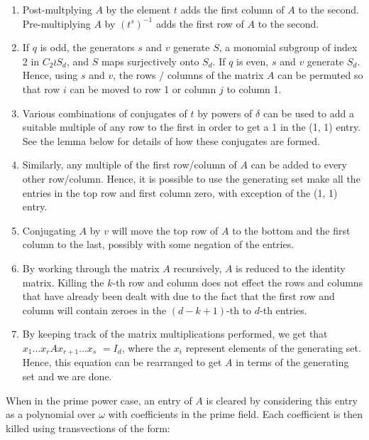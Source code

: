 \documentclass[12pt]{report}
\begin{document}
\begin{enumerate}

\item Post-multplying $A$ by the element $t$ adds the first column of $A$ to the second. Pre-multiplying $A$ by $(t^s)^{-1}$ adds the first row of $A$ to the second.

\item If $q$ is odd, the generators $s$ and $v$ generate $S$, a monomial subgroup of index 2 in $C_2 \wr S_d$, and $S$ maps surjectively onto $S_d$. If $q$ is even, $s$ and $v$ generate $S_d$. Hence, using $s$ and $v$, the rows / columns of the matrix $A$ can be permuted so that row $i$ can be moved to row 1 or column $j$ to column 1.

\item Various combinations of conjugates of $t$ by powers of $\delta$ can be used to add a suitable multiple of any row to the first in order to get a 1 in the (1, 1) entry. See the lemma below for details of how these conjugates are formed.

\item Similarly, any multiple of the first row/column of $A$ can be added to every other row/column. Hence, it is possible to use the generating set make all the entries in the top row and first column zero, with exception of the (1, 1) entry.

\item Conjugating $A$ by $v$ will move the top row of $A$ to the bottom and the first column to the last, possibly with some negation of the entries.

\item By working through the matrix $A$ recursively, $A$ is reduced to the identity matrix. Killing the $k$-th row and column does not effect the rows and columns that have already been dealt with due to the fact that the first row and column will contain zeroes in the $(d - k + 1)$-th to $d$-th entries.

\item By keeping track of the matrix multiplications performed, we get that $x_1 \ldots x_r A x_{r+1} \ldots x_s$ $= I_d$, where the $x_i$ represent elements of the generating set. Hence, this equation can be rearranged to get $A$ in terms of the generating set and we are done.

\end{enumerate}

When in the prime power case, an entry of $A$ is cleared by considering this entry as a polynomial over $\omega$ with coefficients in the prime field. Each coefficient is then killed using transvections of the form:
\end{document}
